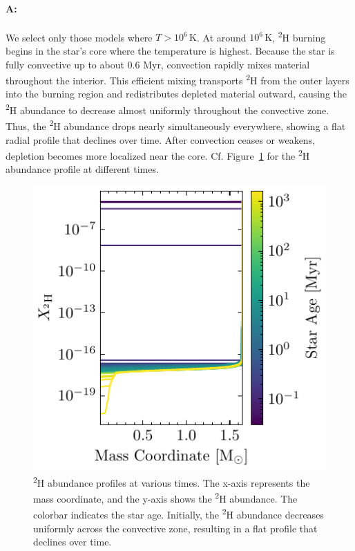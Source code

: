\documentclass[twocolumn,fontsize=11pt]{scrartcl}
\begin{document}
\paragraph{A:} We select only those models where \(T > 10^6\,\mathrm{K}\). At around \(10^6\,\mathrm{K}\), \textsuperscript{2}H burning begins in the star's core where the temperature is highest. Because the star is fully convective up to about \(0.6\) Myr, convection rapidly mixes material throughout the interior. This efficient mixing transports \textsuperscript{2}H from the outer layers into the burning region and redistributes depleted material outward, causing the \textsuperscript{2}H abundance to decrease almost uniformly throughout the convective zone. Thus, the \textsuperscript{2}H abundance drops nearly simultaneously everywhere, showing a flat radial profile that declines over time. After convection ceases or weakens, depletion becomes more localized near the core. Cf. Figure~\ref{fig:q42_h2_profile} for the \textsuperscript{2}H abundance profile at different times. 

\begin{figure}[htbp]
    \centering
    \includegraphics{q42_h2_profile.pdf}
    \caption{\textsuperscript{2}H abundance profiles at various times. The x-axis represents the mass coordinate, and the y-axis shows the \textsuperscript{2}H abundance. The colorbar indicates the star age. Initially, the \textsuperscript{2}H abundance decreases uniformly across the convective zone, resulting in a flat profile that declines over time.}
    \label{fig:q42_h2_profile}
\end{figure}
\end{document}
